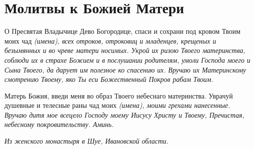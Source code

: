\section{Молитвы к Божией Матери}\begin{mymulticols}


О Пресвятая Владычице Дево Богородице, спаси и сохрани под кровом Твоим моих чад \itshape (имена)\normalfont{}, всех отроков, отроковиц и младенцев, крещеных и безымянных и во чреве матери носимых. Укрой их ризою Твоего материнства, соблюди их в страхе Божием и в послушании родителям, умоли Господа моего и Сына Твоего, да дарует им полезное ко спасению их. Вручаю их Материнскому смотрению Твоему, яко Ты еси Божественный Покров рабам Твоим.

Матерь Божия, введи меня во образ Твоего небеснаго материнства. Уврачуй душевные и телесные раны чад моих \itshape (имена)\normalfont{}, моими грехами нанесенные. Вручаю дитя мое всецело Господу моему Иисусу Христу и Твоему, Пречистая, небесному покровительству. Аминь.

\itshape Из женского монастыря в Шуе, Ивановской области.\normalfont{}




\end{mymulticols}

